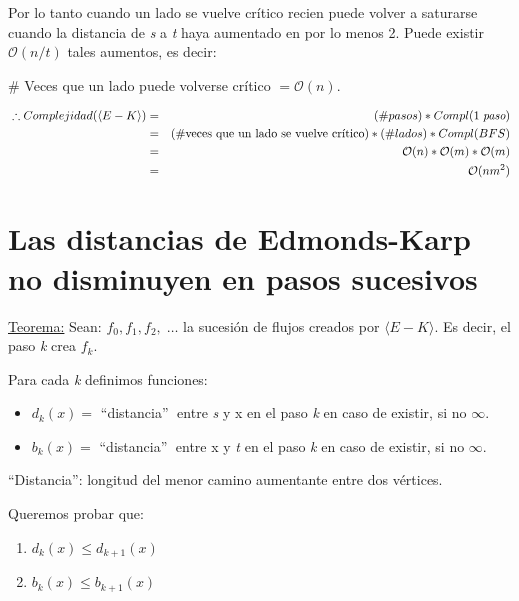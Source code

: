 \documentclass[12pt,a4paper]{report}
\begin{document}
		\vspace{5mm}
		Por lo tanto cuando un lado se vuelve crítico recien puede volver a saturarse cuando la distancia de \textit{s} a \textit{t} haya aumentado en por lo menos 2. Puede existir $\mathcal{O}(n/t)$ tales aumentos, es decir:
		
		\begin{center}
			\# Veces que un lado puede volverse crítico $= \mathcal{O}(n)$. 
		\end{center}				
		
		\begin{eqnarray}
			 \nonumber \; \therefore Complejidad(\langle E-K \rangle) &=& (\# pasos) * Compl(1 \; \textit{paso}) \\
			 \nonumber &=& (\# \textup{veces que un lado se vuelve crítico}) * (\# lados) * Compl(BFS) \\
			\nonumber  &=& \mathcal{O}(n) * \mathcal{O}(m)* \mathcal{O}(m) \\
			\nonumber &=& \mathcal{O}(nm^{2})
		\end{eqnarray}
			
		
	\section{Las distancias de Edmonds-Karp no disminuyen en pasos sucesivos}
		\underline{Teorema:} Sean: $f_{0}, f_{1}, f_{2}, \; \dotsc$ \;  la sucesión de flujos creados por $\langle E-K \rangle$. Es decir, el paso \textit{k} crea $f_{k}$.
		
		\vspace{5mm}
		Para cada \textit{k} definimos funciones:
		
		\begin{itemize}
			\item $d_{k}(x) =$ \textquotedblleft distancia\textquotedblright $\;$ entre \textit{s} y x en el paso \textit{k} en caso de existir, si no $\infty$.
			\item $b_{k}(x) =$ \textquotedblleft distancia\textquotedblright $\;$ entre x y \textit{t} en el paso \textit{k} en caso de existir, si no $\infty$.
		\end{itemize}
	
		\textquotedblleft Distancia\textquotedblright: longitud del menor camino aumentante entre dos vértices.
		
		\vspace{5mm}
		Queremos probar que:
		\begin{enumerate}
			\item $d_{k}(x) \leq d_{k+1}(x)$
			\item $b_{k}(x) \leq b_{k+1}(x)$
		\end{enumerate}
		
\end{document}
